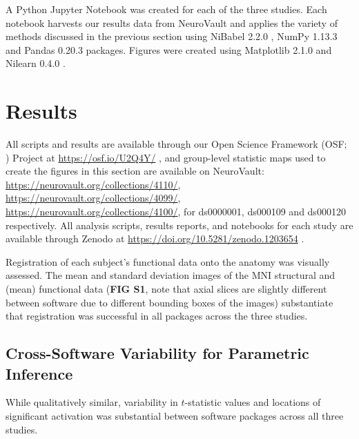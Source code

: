 A Python Jupyter Notebook \citep{Kluyver2016-yl} was created for each of the three studies. Each notebook harvests our results data from NeuroVault and applies the variety of methods discussed in the previous section using NiBabel 2.2.0 \citep{Brett2017-zb}, NumPy 1.13.3 \citep{Walt2011-db} and Pandas 0.20.3 \citep{McKinney2010-dv} packages. Figures were created using Matplotlib 2.1.0 \citep{Hunter2007-nu} and Nilearn 0.4.0 \citep{Abraham2014-ap}. 

\section{Results}

All scripts and results are available through our Open Science Framework (OSF; \citep{Erin_D_Foster2017-au}) Project at \href{https://osf.io/U2Q4Y/}{https://osf.io/U2Q4Y/} \citep{Bowring2018-wp}, and group-level statistic maps used to create the figures in this section are available on NeuroVault: \href{https://neurovault.org/collections/4110/}{https://neurovault.org/collections/4110/}, \href{https://neurovault.org/collections/4099/}{https://neurovault.org/collections/4099/}, \href{https://neurovault.org/collections/4100/}{https://neurovault.org/collections/4100/}, for ds0000001, ds000109 and ds000120 respectively. All analysis scripts, results reports, and notebooks for each study are available through Zenodo \citep{Nielsen2014-vl} at \href{https://doi.org/10.5281/zenodo.1203654}{https://doi.org/10.5281/zenodo.1203654} \citep{Bowring2018-jp}.

Registration of each subject's functional data onto the anatomy was visually assessed. The mean and standard deviation images of the MNI structural and (mean) functional data (\textbf{FIG S1}, note that axial slices are slightly different between software due to different bounding boxes of the images) substantiate that registration was successful in all packages across the three studies. 

\subsection{Cross-Software Variability for Parametric Inference}

While qualitatively similar, variability in $t$-statistic values and locations of significant activation was substantial between software packages across all three studies. 

